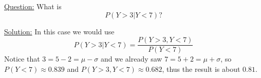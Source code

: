\begin{itemize}
\begin{example}
\noindent

 \noindent
\underline{Question:} What is
\begin{equation*}
P(Y>3|Y<7)?
\end{equation*}

 \noindent
\underline{Solution:} In this case we would use
\begin{equation*}
P(Y>3|Y<7) = \frac{P(Y>3,Y<7)}{P(Y<7)} 
\end{equation*}
Notice that $3 = 5-2 = \mu-\sigma$ and we already saw $7 = 5+2 = \mu+\sigma$, so $P(Y<7) \approx 0.839$ and $P(Y>3,Y<7) \approx 0.682$, thus the result is about $0.81$. 



\end{example}

\end{itemize}





 


  
  
  
  
